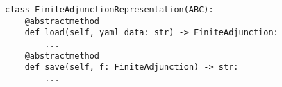 \begin{verbatim}
class FiniteAdjunctionRepresentation(ABC):
    @abstractmethod
    def load(self, yaml_data: str) -> FiniteAdjunction:
        ...
    @abstractmethod
    def save(self, f: FiniteAdjunction) -> str:
        ...
\end{verbatim}